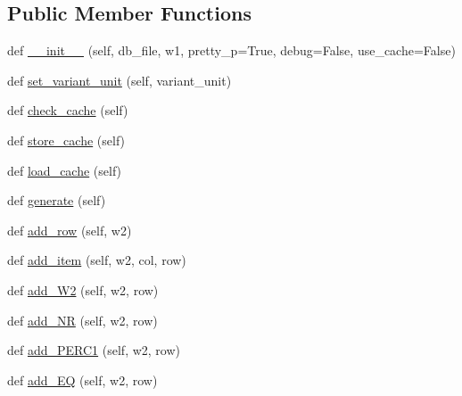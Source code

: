 \subsection*{Public Member Functions}
\begin{DoxyCompactItemize}
\item 
def \hyperlink{classCBGM_1_1lib_1_1pre__genealogical__coherence_1_1Coherence_ae6841155c04b8c5dcf22279b008cb96e}{\+\_\+\+\_\+init\+\_\+\+\_\+} (self, db\+\_\+file, w1, pretty\+\_\+p=True, debug=False, use\+\_\+cache=False)
\item 
def \hyperlink{classCBGM_1_1lib_1_1pre__genealogical__coherence_1_1Coherence_af601453fe8d3cd09f1aff40cab2eb337}{set\+\_\+variant\+\_\+unit} (self, variant\+\_\+unit)
\item 
def \hyperlink{classCBGM_1_1lib_1_1pre__genealogical__coherence_1_1Coherence_ab591327bf2c8ea32dd83b5a70bf1a645}{check\+\_\+cache} (self)
\item 
def \hyperlink{classCBGM_1_1lib_1_1pre__genealogical__coherence_1_1Coherence_a9fa4f45baa2fb418deaebc3d986c0f9d}{store\+\_\+cache} (self)
\item 
def \hyperlink{classCBGM_1_1lib_1_1pre__genealogical__coherence_1_1Coherence_a92716a3375b7dc3f1e065329f64c9369}{load\+\_\+cache} (self)
\item 
def \hyperlink{classCBGM_1_1lib_1_1pre__genealogical__coherence_1_1Coherence_a08998731ef4735695399d884926caa1f}{generate} (self)
\item 
def \hyperlink{classCBGM_1_1lib_1_1pre__genealogical__coherence_1_1Coherence_a0f773cf88d2e3506ba7c1efb0d6d506b}{add\+\_\+row} (self, w2)
\item 
def \hyperlink{classCBGM_1_1lib_1_1pre__genealogical__coherence_1_1Coherence_a0a552f88e30648210586f2c5bfef8108}{add\+\_\+item} (self, w2, col, row)
\item 
def \hyperlink{classCBGM_1_1lib_1_1pre__genealogical__coherence_1_1Coherence_ae137e3950a32c5ca4e7b46735d5b65c6}{add\+\_\+\+W2} (self, w2, row)
\item 
def \hyperlink{classCBGM_1_1lib_1_1pre__genealogical__coherence_1_1Coherence_aef6b6df085413ae7ba84051bc36b2c3f}{add\+\_\+\+NR} (self, w2, row)
\item 
def \hyperlink{classCBGM_1_1lib_1_1pre__genealogical__coherence_1_1Coherence_afe63dbe183b5edd0032b4737590a4c21}{add\+\_\+\+P\+E\+R\+C1} (self, w2, row)
\item 
def \hyperlink{classCBGM_1_1lib_1_1pre__genealogical__coherence_1_1Coherence_a4bc333cbf6af30254c718c27b0a89a24}{add\+\_\+\+EQ} (self, w2, row)

\end{DoxyCompactItemize}
